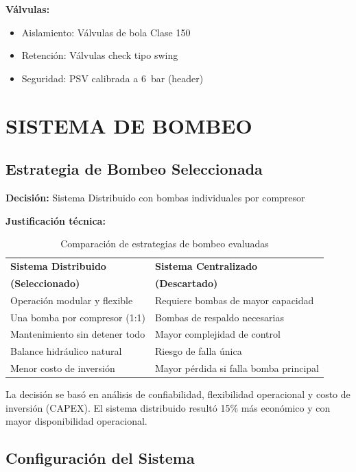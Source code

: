 \documentclass[12pt,a4paper]{article}
\begin{document}
\textbf{Válvulas:}
\begin{itemize}
    \item Aislamiento: Válvulas de bola Clase 150
    \item Retención: Válvulas check tipo swing
    \item Seguridad: PSV calibrada a 6~bar (header)
\end{itemize}

\newpage

\section{SISTEMA DE BOMBEO}

\subsection{Estrategia de Bombeo Seleccionada}

\textbf{Decisión:} Sistema Distribuido con bombas individuales por compresor

\textbf{Justificación técnica:}

\begin{table}[h]
\centering
\caption{Comparación de estrategias de bombeo evaluadas}
\label{tab:estrategia_bombeo}
\small
\begin{tabular}{p{6cm}p{6cm}}
\toprule
\textbf{Sistema Distribuido} & \textbf{Sistema Centralizado} \\
\textbf{(Seleccionado)} & \textbf{(Descartado)} \\
\midrule
Operación modular y flexible & Requiere bombas de mayor capacidad \\
Una bomba por compresor (1:1) & Bombas de respaldo necesarias \\
Mantenimiento sin detener todo & Mayor complejidad de control \\
Balance hidráulico natural & Riesgo de falla única \\
Menor costo de inversión & Mayor pérdida si falla bomba principal \\
\bottomrule
\end{tabular}
\end{table}

La decisión se basó en análisis de confiabilidad, flexibilidad operacional y costo de inversión (CAPEX). El sistema distribuido resultó 15\% más económico y con mayor disponibilidad operacional.

\subsection{Configuración del Sistema}
\end{document}
